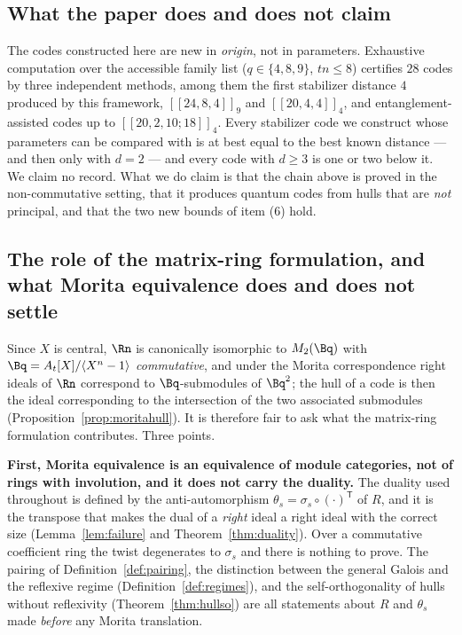 \subsection{What the paper does and does not claim}

The codes constructed here are new in \emph{origin}, not in parameters.
Exhaustive computation over the accessible family list ($q\in\{4,8,9\}$,
$tn\le8$) certifies $28$ codes by three independent methods, among them the
first stabilizer distance $4$ produced by this framework, $[[24,8,4]]_9$ and
$[[20,4,4]]_4$, and entanglement-assisted codes up to $[[20,2,10;18]]_4$. Every
stabilizer code we construct whose parameters can be compared with
\cite{GrasslCodetables} is at best equal to the best known distance --- and then
only with $d=2$ --- and every code with $d\ge3$ is one or two below it. We claim
no record. What we do claim is that the chain above is proved in the
non-commutative setting, that it produces quantum codes from hulls that are
\emph{not} principal, and that the two new bounds of item (6) hold.

\subsection{The role of the matrix-ring formulation, and what Morita
            equivalence does and does not settle}
\label{subsec:morita}

Since $X$ is central, $\Rn$ is canonically isomorphic to $M_2(\Bq)$ with
$\Bq=A_t[X]/\langle X^n-1\rangle$ \emph{commutative}, and under the Morita
correspondence right ideals of $\Rn$ correspond to $\Bq$-submodules of
$\Bq^2$; the hull of a code is then the ideal corresponding to the
intersection of the two associated submodules
(Proposition~\ref{prop:moritahull}). It is therefore fair to ask what the
matrix-ring formulation contributes. Three points.

\textbf{First, Morita equivalence is an equivalence of module categories, not
of rings with involution, and it does not carry the duality.} The duality used
throughout is defined by the anti-automorphism
$\theta_s=\sigma_s\circ(\cdot)^{\mathsf T}$ of $R$, and it is the transpose
that makes the dual of a \emph{right} ideal a right ideal with the correct
size (Lemma~\ref{lem:failure} and Theorem~\ref{thm:duality}). Over a
commutative coefficient ring the twist degenerates to $\sigma_s$ and there is
nothing to prove. The pairing of Definition~\ref{def:pairing}, the distinction
between the general Galois and the reflexive regime
(Definition~\ref{def:regimes}), and the self-orthogonality of hulls without
reflexivity (Theorem~\ref{thm:hullso}) are all statements about $R$ and
$\theta_s$ made \emph{before} any Morita translation.

